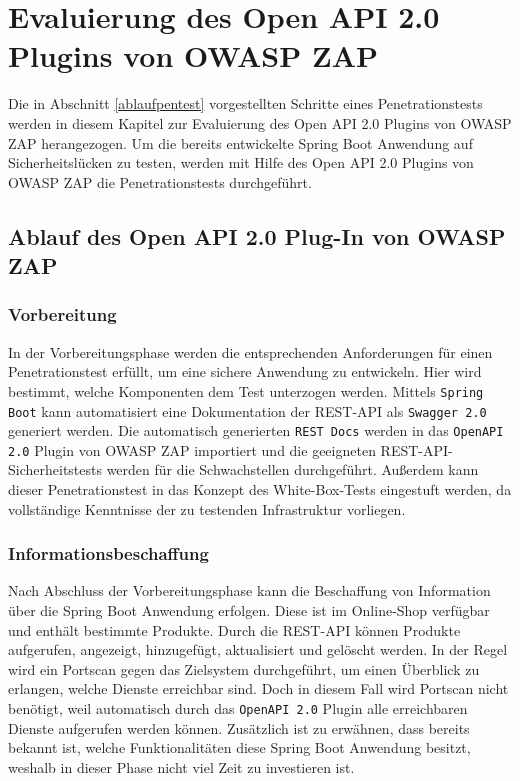 \chapter{Evaluierung des Open API 2.0 Plugins von OWASP ZAP}
\label{cha:k5}

Die in Abschnitt \ref{ablaufpentest} vorgestellten Schritte eines Penetrationstests werden in diesem Kapitel zur Evaluierung des Open API 2.0 Plugins von OWASP ZAP herangezogen. Um die bereits entwickelte Spring Boot Anwendung auf Sicherheitslücken zu testen, werden mit Hilfe des Open API 2.0 Plugins von OWASP ZAP die Penetrationstests durchgeführt.

\section{Ablauf des Open API 2.0 Plug-In von OWASP ZAP}

\subsection{Vorbereitung}

In der Vorbereitungsphase werden die entsprechenden Anforderungen für einen Penetrationstest erfüllt, um eine sichere Anwendung zu entwickeln. Hier wird bestimmt, welche Komponenten dem Test unterzogen werden. Mittels \texttt{Spring Boot} kann automatisiert eine Dokumentation der REST-API als \texttt{Swagger 2.0} generiert werden. Die automatisch generierten \texttt{REST Docs} werden in das \texttt{OpenAPI 2.0} Plugin von OWASP ZAP importiert und die geeigneten REST-API-Sicherheitstests werden für die Schwachstellen durchgeführt. Außerdem kann dieser Penetrationstest in das Konzept des White-Box-Tests eingestuft werden, da vollständige Kenntnisse der zu testenden Infrastruktur vorliegen.

\subsection{Informationsbeschaffung}

Nach Abschluss der Vorbereitungsphase kann die Beschaffung von Information über die Spring Boot Anwendung erfolgen. Diese ist im Online-Shop verfügbar und enthält bestimmte Produkte. Durch die REST-API können Produkte aufgerufen, angezeigt, hinzugefügt, aktualisiert und gelöscht werden. In der Regel wird ein Portscan gegen das Zielsystem durchgeführt, um einen Überblick zu erlangen, welche Dienste erreichbar sind. Doch in diesem Fall wird Portscan nicht benötigt, weil automatisch durch das \texttt{OpenAPI 2.0} Plugin alle erreichbaren Dienste aufgerufen werden können. Zusätzlich ist zu erwähnen, dass bereits bekannt ist, welche Funktionalitäten diese Spring Boot Anwendung besitzt, weshalb in dieser Phase nicht viel Zeit zu investieren ist.

